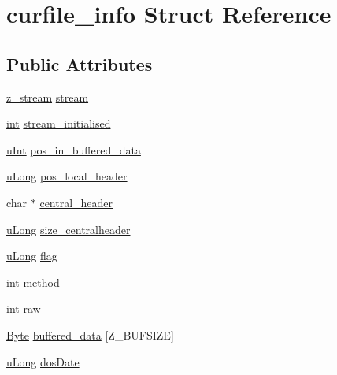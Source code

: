 \hypertarget{structcurfile__info}{\section{curfile\-\_\-info Struct Reference}
\label{structcurfile__info}
}
\subsection*{Public Attributes}
\begin{DoxyCompactItemize}
\item 
\hyperlink{zlib_8h_afa60092f4e0b9bc4f23b41c6930463f0}{z\-\_\-stream} \hyperlink{structcurfile__info_a902dbbcce2f8a9b5d5f0ac705f9c914c}{stream}
\item 
\hyperlink{ioapi_8h_a787fa3cf048117ba7123753c1e74fcd6}{int} \hyperlink{structcurfile__info_a4408645945defb3e3e72fd354d4e98b2}{stream\-\_\-initialised}
\item 
\hyperlink{zconf_8h_a87d141052bcd5ec8a80812a565c70369}{u\-Int} \hyperlink{structcurfile__info_ab1e433122ecceb389c8d258830e89f6f}{pos\-\_\-in\-\_\-buffered\-\_\-data}
\item 
\hyperlink{zconf_8h_a154b3b80120c903a368fec5f11f3007a}{u\-Long} \hyperlink{structcurfile__info_ae859aac5711395f5136a26a393f4f3ec}{pos\-\_\-local\-\_\-header}
\item 
char $\ast$ \hyperlink{structcurfile__info_a6b8d86737b9297846fc67799c8c42e21}{central\-\_\-header}
\item 
\hyperlink{zconf_8h_a154b3b80120c903a368fec5f11f3007a}{u\-Long} \hyperlink{structcurfile__info_a25272deebbc7e9f5f474f4c2b36e27a6}{size\-\_\-centralheader}
\item 
\hyperlink{zconf_8h_a154b3b80120c903a368fec5f11f3007a}{u\-Long} \hyperlink{structcurfile__info_a9484e7dcce78fd7856e3048357115172}{flag}
\item 
\hyperlink{ioapi_8h_a787fa3cf048117ba7123753c1e74fcd6}{int} \hyperlink{structcurfile__info_ac69364c19c39e2962e8f247f4b760d5f}{method}
\item 
\hyperlink{ioapi_8h_a787fa3cf048117ba7123753c1e74fcd6}{int} \hyperlink{structcurfile__info_ab79a678fff8d4fb6e55f410d33a5d555}{raw}
\item 
\hyperlink{zconf_8h_ae3a497195d617519e5353ea7b417940f}{Byte} \hyperlink{structcurfile__info_a73ba705398941ee5d8f0cfc61df6b82d}{buffered\-\_\-data} \mbox{[}Z\-\_\-\-B\-U\-F\-S\-I\-Z\-E\mbox{]}
\item 
\hyperlink{zconf_8h_a154b3b80120c903a368fec5f11f3007a}{u\-Long} \hyperlink{structcurfile__info_afb63cc461b5237c76e41904ed9fb726a}{dos\-Date}

\end{DoxyCompactItemize}
